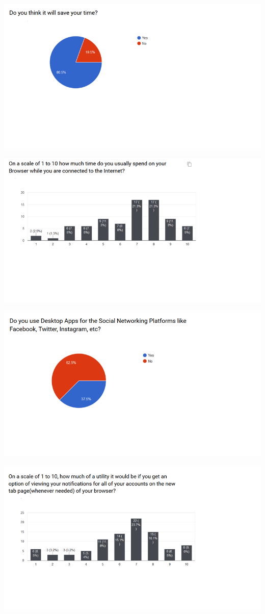 \documentclass[12pt]{article}
\begin{document}
  \includegraphics[width=\linewidth]{srs6.png}
  
  \includegraphics[width=\linewidth]{srs7.png}
  
  \includegraphics[width=\linewidth]{srs8.png}
  
  \includegraphics[width=\linewidth]{srs9.png}
  
\end{document}
